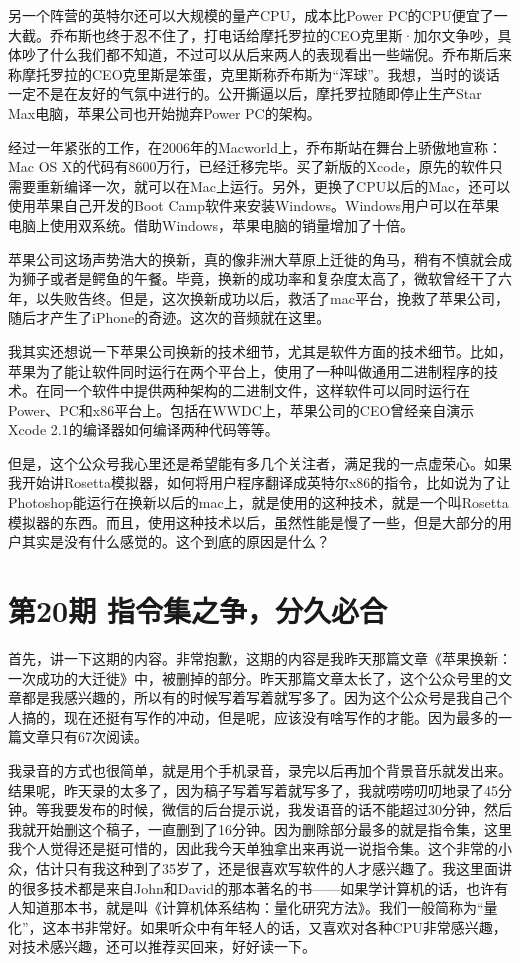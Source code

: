 \documentclass[
  letterpaper,
  DIV=11,
  numbers=noendperiod]{scrreprt}
\begin{document}
另一个阵营的英特尔还可以大规模的量产CPU，成本比Power
PC的CPU便宜了一大截。乔布斯也终于忍不住了，打电话给摩托罗拉的CEO克里斯·加尔文争吵，具体吵了什么我们都不知道，不过可以从后来两人的表现看出一些端倪。乔布斯后来称摩托罗拉的CEO克里斯是笨蛋，克里斯称乔布斯为``浑球''。我想，当时的谈话一定不是在友好的气氛中进行的。公开撕逼以后，摩托罗拉随即停止生产Star
Max电脑，苹果公司也开始抛弃Power PC的架构。

经过一年紧张的工作，在2006年的Macworld上，乔布斯站在舞台上骄傲地宣称：Mac
OS
X的代码有8600万行，已经迁移完毕。买了新版的Xcode，原先的软件只需要重新编译一次，就可以在Mac上运行。另外，更换了CPU以后的Mac，还可以使用苹果自己开发的Boot
Camp软件来安装Windows。Windows用户可以在苹果电脑上使用双系统。借助Windows，苹果电脑的销量增加了十倍。

苹果公司这场声势浩大的换新，真的像非洲大草原上迁徙的角马，稍有不慎就会成为狮子或者是鳄鱼的午餐。毕竟，换新的成功率和复杂度太高了，微软曾经干了六年，以失败告终。但是，这次换新成功以后，救活了mac平台，挽救了苹果公司，随后才产生了iPhone的奇迹。这次的音频就在这里。

我其实还想说一下苹果公司换新的技术细节，尤其是软件方面的技术细节。比如，苹果为了能让软件同时运行在两个平台上，使用了一种叫做通用二进制程序的技术。在同一个软件中提供两种架构的二进制文件，这样软件可以同时运行在Power、PC和x86平台上。包括在WWDC上，苹果公司的CEO曾经亲自演示Xcode
2.1的编译器如何编译两种代码等等。

但是，这个公众号我心里还是希望能有多几个关注者，满足我的一点虚荣心。如果我开始讲Rosetta模拟器，如何将用户程序翻译成英特尔x86的指令，比如说为了让Photoshop能运行在换新以后的mac上，就是使用的这种技术，就是一个叫Rosetta模拟器的东西。而且，使用这种技术以后，虽然性能是慢了一些，但是大部分的用户其实是没有什么感觉的。这个到底的原因是什么？


\chapter{第20期
指令集之争，分久必合}\label{ux7b2c20ux671f-ux6307ux4ee4ux96c6ux4e4bux4e89ux5206ux4e45ux5fc5ux5408}

首先，讲一下这期的内容。非常抱歉，这期的内容是我昨天那篇文章《苹果换新：一次成功的大迁徙》中，被删掉的部分。昨天那篇文章太长了，这个公众号里的文章都是我感兴趣的，所以有的时候写着写着就写多了。因为这个公众号是我自己个人搞的，现在还挺有写作的冲动，但是呢，应该没有啥写作的才能。因为最多的一篇文章只有67次阅读。

我录音的方式也很简单，就是用个手机录音，录完以后再加个背景音乐就发出来。结果呢，昨天录的太多了，因为稿子写着写着就写多了，我就唠唠叨叨地录了45分钟。等我要发布的时候，微信的后台提示说，我发语音的话不能超过30分钟，然后我就开始删这个稿子，一直删到了16分钟。因为删除部分最多的就是指令集，这里我个人觉得还是挺可惜的，因此我今天单独拿出来再说一说指令集。这个非常的小众，估计只有我这种到了35岁了，还是很喜欢写软件的人才感兴趣了。我这里面讲的很多技术都是来自John和David的那本著名的书------如果学计算机的话，也许有人知道那本书，就是叫《计算机体系结构：量化研究方法》。我们一般简称为``量化''，这本书非常好。如果听众中有年轻人的话，又喜欢对各种CPU非常感兴趣，对技术感兴趣，还可以推荐买回来，好好读一下。
\end{document}
